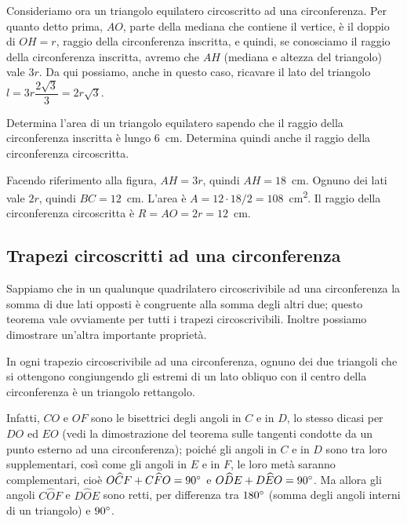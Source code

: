 Consideriamo ora un triangolo equilatero circoscritto ad una circonferenza.
Per quanto detto prima, $AO$, parte della mediana che contiene il vertice, è il doppio di $OH = r$, raggio della circonferenza inscritta, e quindi, se conosciamo il raggio della circonferenza inscritta, avremo che $AH$ (mediana e altezza del triangolo) vale $3r$. Da qui possiamo, anche in questo caso, ricavare il lato del triangolo $l=3r\dfrac{2\sqrt{3}}{3}=2r\sqrt{3}$.

\begin{exrig}
\begin{esempio}
Determina l'area di un triangolo equilatero sapendo che il raggio della circonferenza inscritta è lungo 6~cm. Determina quindi anche il raggio della circonferenza circoscritta.\vspace{7pt}

Facendo riferimento alla figura, $AH=3r$, quindi $AH = 18$~cm. 
Ognuno dei lati vale $2r$, quindi $BC = 12$~cm.
L'area è $A = 12\cdot 18 / 2 = 108$~cm\textsuperscript{2}.
Il raggio della circonferenza circoscritta è $R= AO = 2r = 12$~cm.
\end{esempio}
\end{exrig}

\subsection{Trapezi circoscritti ad una circonferenza}

Sappiamo che in un qualunque quadrilatero circoscrivibile ad una circonferenza la somma di due lati opposti è congruente alla somma degli altri due; questo teorema vale ovviamente per tutti i trapezi circoscrivibili.
Inoltre possiamo dimostrare un'altra importante proprietà.

\begin{proprieta}
In ogni trapezio circoscrivibile ad una circonferenza, ognuno dei due triangoli che si ottengono congiungendo gli estremi di un lato obliquo con il centro della circonferenza è un triangolo rettangolo.
\end{proprieta}

Infatti, $CO$ e $OF$ sono le bisettrici degli angoli in $C$ e in $D$, lo stesso dicasi per $DO$ ed $EO$ (vedi la dimostrazione del teorema sulle tangenti condotte da un punto esterno ad una circonferenza); poiché gli angoli in $C$ e in $D$ sono tra loro supplementari, così come gli angoli in $E$ e in $F$, le loro metà saranno complementari, cioè $O\widehat{C}F+C\widehat{F}O=90{}^{\circ}$ e $O\widehat{D}E+D\widehat{E}O=90{}^{\circ}$. Ma allora gli angoli $C\widehat{O}F$ e $D\widehat{O}E$ sono retti, per differenza tra $180{}^{\circ}$ (somma degli angoli interni di un triangolo) e $90{}^{\circ}$.

